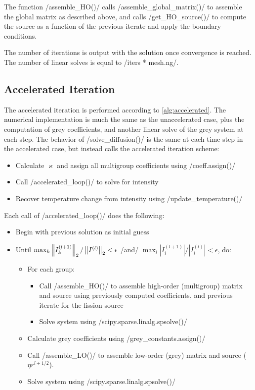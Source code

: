 \documentclass{template}
\begin{document}
The function {\pythoninline/assemble_HO()/} calls {\pythoninline/assemble_global_matrix()/} to assemble the global matrix as described above, and calls {\pythoninline/get_HO_source()/} to compute the source as a function of the previous iterate and apply the boundary conditions.

The number of iterations is output with the solution once convergence is reached. The number of linear solves is equal to {\pythoninline/iters * mesh.ng/}.



\subsection{Accelerated Iteration}

The accelerated iteration is performed according to \autoref{alg:accelerated}. The numerical implementation is much the same as the unaccelerated case, plus the computation of grey coefficients, and another linear solve of the grey system at each step. The behavior of {\pythoninline/solve_diffusion()/} is the same at each time step in the accelerated case, but instead calls the accelerated iteration scheme:

\begin{itemize}
    \item Calculate $\varkappa$ and assign all multigroup coefficients using {\pythoninline/coeff.assign()/}
    \item Call {\pythoninline/accelerated_loop()/} to solve for intensity
    \item Recover temperature change from intensity using {\pythoninline/update_temperature()/}
\end{itemize}

Each call of {\pythoninline/accelerated_loop()/} does the following:

\begin{itemize}
    \item Begin with previous solution as initial guess
    \item Until $\max_k \left\| {I_k^{(l+1)}} \right\|_2/\left\| {I^{(l)}} \right\|_2 < \epsilon$ {\pythoninline/and/} $\max_i |I_{i}^{(l+1)}|/|I_{i}^{(l)}| < \epsilon$, do:
    \begin{itemize}
        \item For each group:
        \begin{itemize}
        \item Call {\pythoninline/assemble_HO()/} to assemble high-order (multigroup) matrix and source using previously computed coefficients, and previous iterate for the fission source
        \item Solve system using {\pythoninline/scipy.sparse.linalg.spsolve()/}
    \end{itemize}
    \item Calculate grey coefficients using {\pythoninline/grey_constants.assign()/}
    \item Call {\pythoninline/assemble_LO()/} to assemble low-order (grey) matrix and source ($\eta r^{l+1/2}$).
    \item Solve system using {\pythoninline/scipy.sparse.linalg.spsolve()/}
    \end{itemize}
\end{itemize}
\end{document}
